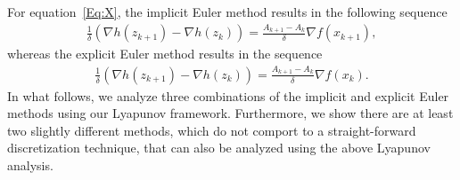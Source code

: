 \documentclass[11pt]{article}
\theoremstyle{plain}
\begin{document}
 For equation~\eqref{Eq:X}, the implicit Euler method results in the following sequence
 \begin{align*}
 \frac{1}{\delta}(\nabla h(z_{k+1}) - \nabla h(z_k)) = \frac{A_{k+1} - A_k}{\delta} \nabla f(x_{k+1}),
 \end{align*}
 whereas the explicit Euler method results in the sequence
 \begin{align*}
  \frac{1}{\delta}(\nabla h(z_{k+1}) - \nabla h(z_k)) = \frac{A_{k+1} - A_k}{\delta} \nabla f(x_{k}).
 \end{align*}
 In what follows, we analyze three combinations of the implicit and explicit Euler methods using our Lyapunov framework. Furthermore, we show there are at least two slightly different methods, which do not comport to a straight-forward discretization technique, that can also be analyzed using the above Lyapunov analysis. 
\end{document}
